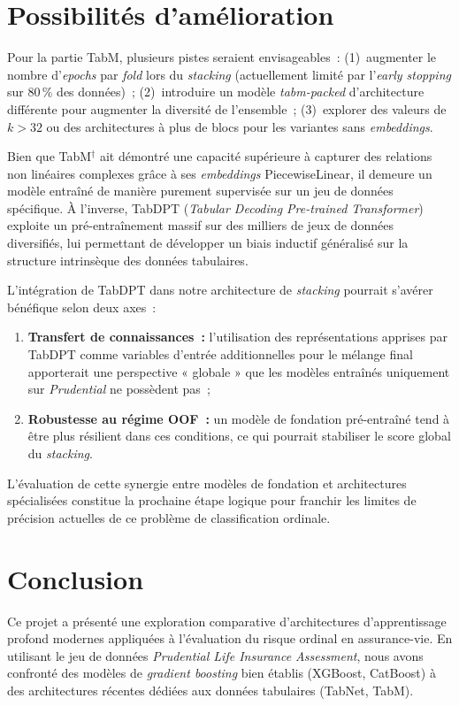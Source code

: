 \documentclass[conference]{IEEEtran}
\begin{document}
\section{Possibilités d'amélioration}
\label{sec:ameliorations}

Pour la partie TabM, plusieurs pistes seraient envisageables~: (1)~augmenter le nombre d'\textit{epochs} par \textit{fold} lors du \textit{stacking} (actuellement limité par l'\textit{early stopping} sur $80\,\%$ des données)~; (2)~introduire un modèle \textit{tabm-packed} d'architecture différente pour augmenter la diversité de l'ensemble~; (3)~explorer des valeurs de $k>32$ ou des architectures à plus de blocs pour les variantes sans \textit{embeddings}.

Bien que TabM$^{\dagger}$ ait démontré une capacité supérieure à capturer des relations non linéaires complexes grâce à ses \textit{embeddings} PiecewiseLinear, il demeure un modèle entraîné de manière purement supervisée sur un jeu de données spécifique. À l'inverse, TabDPT (\textit{Tabular Decoding Pre-trained Transformer})~\cite{tabdpt2024} exploite un pré-entraînement massif sur des milliers de jeux de données diversifiés, lui permettant de développer un biais inductif généralisé sur la structure intrinsèque des données tabulaires.

L'intégration de TabDPT dans notre architecture de \textit{stacking} pourrait s'avérer bénéfique selon deux axes~:
\begin{enumerate}
    \item \textbf{Transfert de connaissances~:} l'utilisation des représentations apprises par TabDPT comme variables d'entrée additionnelles pour le mélange final apporterait une perspective « globale » que les modèles entraînés uniquement sur \textit{Prudential} ne possèdent pas~;
    \item \textbf{Robustesse au régime OOF~:} un modèle de fondation pré-entraîné tend à être plus résilient dans ces conditions, ce qui pourrait stabiliser le score global du \textit{stacking}.
\end{enumerate}

L'évaluation de cette synergie entre modèles de fondation et architectures spécialisées constitue la prochaine étape logique pour franchir les limites de précision actuelles de ce problème de classification ordinale.

\section{Conclusion}
\label{sec:conclusion}
Ce projet a présenté une exploration comparative d'architectures d'apprentissage profond modernes appliquées à l'évaluation du risque ordinal en assurance-vie. En utilisant le jeu de données \textit{Prudential Life Insurance Assessment}, nous avons confronté des modèles de \textit{gradient boosting} bien établis (XGBoost, CatBoost) à des architectures récentes dédiées aux données tabulaires (TabNet, TabM).
\end{document}
